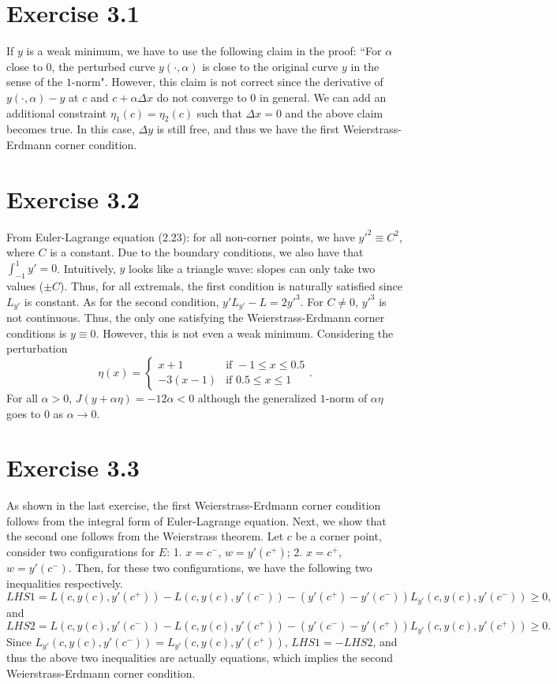 \documentclass[11pt]{report}
\begin{document}

\section*{Exercise 3.1}
If $y$ is a weak minimum, we have to use the following claim in the proof: ``For $\alpha$ close to 0, the perturbed curve $y(\cdot, \alpha)$ is close to the original curve $y$ in the sense of the $1$-norm". However, this claim is not correct since the derivative of $y(\cdot, \alpha) - y$ at $c$ and $c+\alpha\Delta x$ do not converge to $0$ in general. We can add an additional constraint $\eta_1(c)=\eta_2(c)$ such that $\Delta x = 0$ and the above claim becomes true. In this case, $\Delta y$ is still free, and thus we have the first Weierstrass-Erdmann corner condition.
\section*{Exercise 3.2}
From Euler-Lagrange equation (2.23): for all non-corner points, we have $y'^2 \equiv C^2$, where $C$ is a constant. Due to the boundary conditions, we also have that $\int_{-1}^{1} y' = 0$. Intuitively, $y$ looks like a triangle wave: slopes can only take two values ($\pm C$). Thus, for all extremals, the first condition is naturally satisfied since $L_{y'}$ is constant. As for the second condition, $y'L_{y'}-L = 2y'^3$. For $C \neq 0$, $y'^3$ is not continuous. Thus, the only one satisfying the Weierstrass-Erdmann corner conditions is $y \equiv 0$. However, this is not even a weak minimum. Considering the perturbation \[
\eta(x) = \begin{cases} x+1 &\mbox{if } -1 \leq x \leq 0.5 \\
-3(x-1) & \mbox{if } 0.5 \leq x \leq 1 \end{cases}.
\]
For all $\alpha > 0$, $J(y+\alpha\eta) = -12\alpha < 0$ although the generalized $1$-norm of $\alpha \eta$ goes to $0$ as $\alpha \to 0$.

\section*{Exercise 3.3}
As shown in the last exercise, the first Weierstrass-Erdmann corner condition follows from the integral form of Euler-Lagrange equation. Next, we show that the second one follows from the Weierstrass theorem. Let $c$ be a corner point, consider two configurations for $E$: 1. $x = c^-$, $w = y'(c^+)$; 2. $x = c^+$, $w = y'(c^-)$. Then, for these two configurations, we have the following two inequalities respectively.
\[
LHS1 = L(c,y(c),y'(c^+)) - L(c,y(c),y'(c^-)) - (y'(c^+) - y'(c^-))L_{y'}(c,y(c),y'(c^-)) \geq 0,
\]
and
\[
LHS2 = L(c,y(c),y'(c^-)) - L(c,y(c),y'(c^+)) - (y'(c^-) - y'(c^+))L_{y'}(c,y(c),y'(c^+)) \geq 0.
\]
Since $L_{y'}(c,y(c),y'(c^-)) = L_{y'}(c,y(c),y'(c^+))$, $LHS1 = -LHS2$, and thus the above two inequalities are actually equations, which implies the second Weierstrass-Erdmann corner condition.
\end{document}
